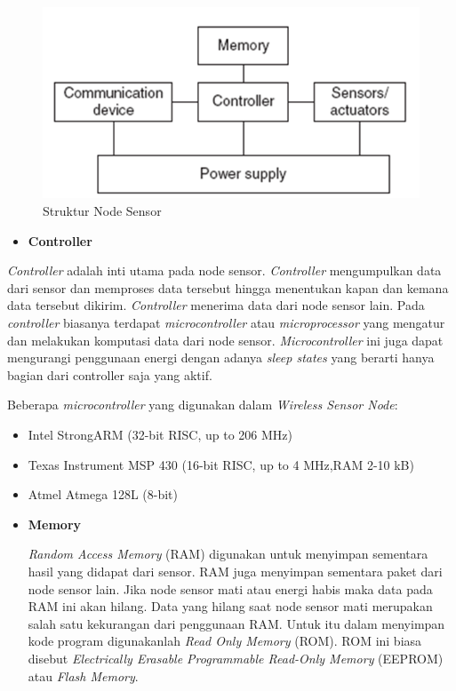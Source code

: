 \documentclass[a4paper,twoside]{article}
\begin{document}
\begin{enumerate}
\begin{itemize}
\begin{figure} [H]
	\centering  
	\includegraphics[scale=0.3]{Gambar/structure_sensor_node}  
	\caption[Struktur Node Sensor]{Struktur Node Sensor} 
	\label{fig:structure_sensor_node} 
\end{figure}

\begin{itemize}
\item \textbf{Controller}
\end{itemize}
\textit{Controller} adalah inti utama pada node sensor. \textit{Controller} mengumpulkan data dari sensor dan memproses data tersebut hingga menentukan kapan dan kemana data tersebut dikirim. \textit{Controller} menerima data dari node sensor lain. Pada \textit{controller} biasanya terdapat \textit{microcontroller} atau \textit{microprocessor} yang mengatur dan melakukan komputasi data dari node sensor. \textit{Microcontroller} ini juga dapat mengurangi penggunaan energi dengan adanya \textit{sleep states} yang berarti hanya bagian dari controller saja yang aktif.

Beberapa \textit{microcontroller} yang digunakan dalam \textit{Wireless Sensor Node}:
\begin{itemize}
	\item Intel StrongARM (32-bit RISC, up to 206 MHz)
	\item Texas Instrument MSP 430 (16-bit RISC, up to 4 MHz,RAM 2-10 kB)
	\item Atmel Atmega 128L (8-bit)
\end{itemize}	

\begin{itemize}
\item \textbf{Memory}

\textit{Random Access Memory} (RAM) digunakan untuk menyimpan sementara hasil yang didapat dari sensor. RAM juga menyimpan sementara paket dari node sensor lain. Jika node sensor mati atau energi habis maka data pada RAM ini akan hilang. Data yang hilang saat node sensor mati merupakan salah satu kekurangan dari penggunaan RAM. Untuk itu dalam menyimpan kode program digunakanlah \textit{Read Only Memory} (ROM). ROM ini biasa disebut \textit{Electrically Erasable Programmable Read-Only Memory} (EEPROM) atau \textit{Flash Memory}.
\end{itemize}


\end{itemize}
\end{enumerate}
\end{document}
